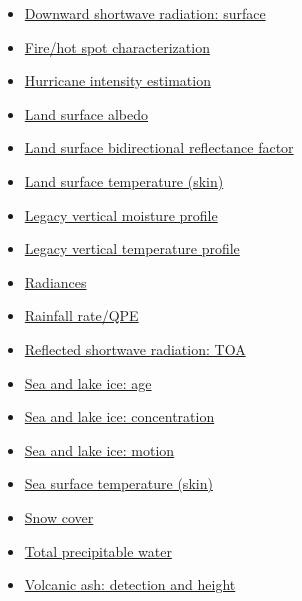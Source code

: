 \begin{itemize}
\item \href{https://www.goes-r.gov/products/baseline-DSR.html}{Downward shortwave radiation: surface}
\item \href{https://www.goes-r.gov/products/baseline-fire-hot-spot.html}{Fire/hot spot characterization}
\item \href{https://www.goes-r.gov/products/baseline-hurricane-intensity.html}{Hurricane intensity estimation}
\item \href{https://www.goes-r.gov/products/LSA.html}{Land surface albedo}
\item \href{https://www.goes-r.gov/products/BRF.html}{Land surface bidirectional reflectance factor}
\item \href{https://www.goes-r.gov/products/baseline-LST.html}{Land surface temperature (skin)}
\item \href{https://www.goes-r.gov/products/baseline-legacy-vert-moisture-profile.html}{Legacy vertical moisture profile}
\item \href{https://www.goes-r.gov/products/baseline-legacy-vert-temp-profile.html}{Legacy vertical temperature profile}
\item \href{https://www.goes-r.gov/products/baseline-radiances.html}{Radiances}
\item \href{https://www.goes-r.gov/products/baseline-rainfall-rate-qpe.html}{Rainfall rate/QPE}
\item \href{https://www.goes-r.gov/products/baseline-TOA.html}{Reflected shortwave radiation: TOA}
\item \href{https://www.goes-r.gov/products/opt2-sea-lake-ice-age.html}{Sea and lake ice: age}
\item \href{https://www.goes-r.gov/products/opt2-sea-lake-ice-concentration.html}{Sea and lake ice: concentration}
\item \href{https://www.goes-r.gov/products/opt2-sea-lake-ice-motion.html}{Sea and lake ice: motion}
\item \href{https://www.goes-r.gov/products/baseline-SST.html}{Sea surface temperature (skin)}
\item \href{https://www.goes-r.gov/products/baseline-snow-cover.html}{Snow cover}
\item \href{https://www.goes-r.gov/products/baseline-total-precipitable-water.html}{Total precipitable water}
\item \href{https://www.goes-r.gov/products/baseline-volcanic-ash.html}{Volcanic ash: detection and height}
\end{itemize}


